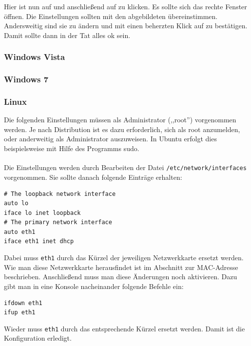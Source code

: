 Hier ist nun auf  und anschließend
auf  zu klicken. Es sollte sich das rechte Fenster
öffnen.
Die Einstellungen sollten mit den abgebildeten
übereinstimmen. Andersweitig sind sie zu ändern und mit einen
beherzten Klick auf  zu bestätigen. Damit sollte dann in der
Tat alles ok sein.
\subsubsection{Windows Vista}

\subsubsection{Windows 7}

\subsubsection{Linux}
Die folgenden Einstellungen müssen als Administrator (,,root'') vorgenommen
werden. Je nach Distribution ist es dazu erforderlich, sich als root
anzumelden, oder anderweitig als Administrator auszuweisen. In Ubuntu
erfolgt dies beispielsweise mit Hilfe des Programms sudo.\\\\
Die Einstellungen werden durch Bearbeiten der Datei
\texttt{/etc/network/interfaces} vorgenommen. Sie sollte danach
folgende Einträge erhalten:
\begin{verbatim}
# The loopback network interface
auto lo 
iface lo inet loopback
# The primary network interface
auto eth1
iface eth1 inet dhcp 
\end{verbatim}
Dabei muss \texttt{eth1} durch das Kürzel der jeweiligen Netzwerkkarte
ersetzt werden. Wie man diese Netzwerkkarte herausfindet ist im
Abschnitt zur MAC-Adresse beschrieben. Anschließend muss man diese
Änderungen noch aktivieren. Dazu gibt man in eine Konsole nacheinander
folgende Befehle ein:
\begin{verbatim}
ifdown eth1
ifup eth1
\end{verbatim}
Wieder muss \texttt{eth1} durch das entsprechende Kürzel ersetzt
werden. Damit ist die Konfiguration erledigt.

